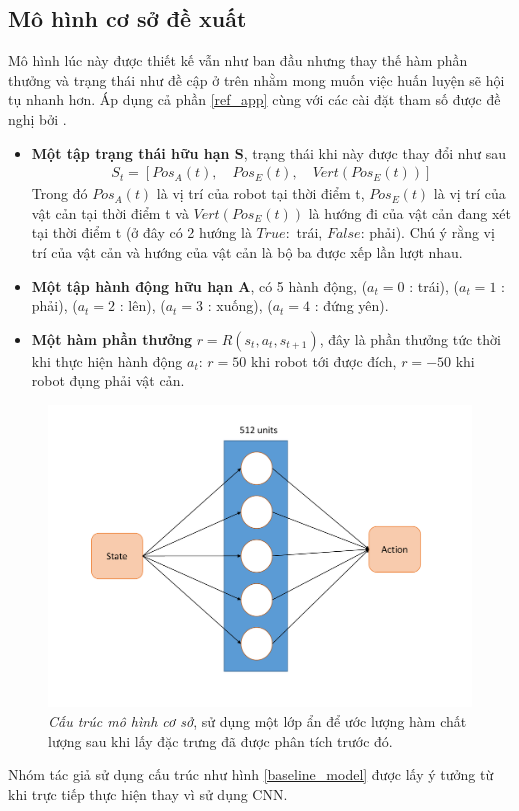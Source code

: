 \subsection{Mô hình cơ sở đề xuất}
Mô hình lúc này được thiết kế vẫn như ban đầu nhưng thay thế hàm phần thưởng và trạng thái như đề cập ở trên nhằm mong muốn việc huấn luyện sẽ hội tụ nhanh hơn. Áp dụng cả phần \ref{ref_app} cùng với các cài đặt tham số được đề nghị bởi \cite{Human-level-control}.
\begin{itemize}\label{change_state}
    \item \textbf{Một tập trạng thái hữu hạn S}, trạng thái khi này được thay đổi như sau
    \begin{align}
        S_t = \left[ Pos_A(t),\quad Pos_E(t),\quad Vert(Pos_E(t))\right]
    \end{align}
    Trong đó $Pos_A(t)$ là vị trí của robot tại thời điểm t, $Pos_E(t)$ là vị trí của vật cản tại thời điểm t và $Vert(Pos_E(t))$ là hướng đi của vật cản đang xét tại thời điểm t (ở đây có 2 hướng là $True:$ trái, $False$: phải). Chú ý rằng vị trí của vật cản và hướng của vật cản là bộ ba được xếp lần lượt nhau.
    \item \textbf{Một tập hành động hữu hạn A},  có 5 hành động,  ($a_t=0$ : trái),  ($a_t=1$ : phải), ($a_t=2$ : lên), ($a_t=3$ : xuống), ($a_t=4$ : đứng yên).
    \item \textbf{Một hàm phần thưởng} $r = R(s_t, a_t, s_{t+1})$, đây là phần thưởng tức thời khi thực hiện hành động $a_t$: $r =50$ khi robot tới được đích, $r=-50$ khi robot đụng phải vật cản.
\end{itemize}
\begin{figure}[h]
    \centering
    \includegraphics[height=80mm,width=140mm]{Pic/baseline/baseline_archetect.pdf}
    \caption[Cấu trúc mô hình cơ sở]{\textit{Cấu trúc mô hình cơ sở}, sử dụng một lớp ẩn để ước lượng hàm chất lượng sau khi lấy đặc trưng đã được phân tích trước đó.}
    \label{fig:baseline_archetect}
\end{figure}
Nhóm tác giả sử dụng cấu trúc như hình \ref{baseline_model} được lấy ý tưởng từ \cite{DBLP:journals/corr/MnihKSGAWR13} khi trực tiếp thực hiện thay vì sử dụng CNN.
\vspace{1cm}
